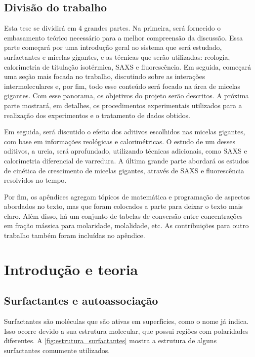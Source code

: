 
	\chapter*{Divisão do trabalho}
Esta tese se dividirá em 4 grandes partes. Na primeira, será fornecido o embasamento teórico necessário para a melhor compreensão da discussão. Essa parte começará por uma introdução geral ao sistema que será estudado, surfactantes e micelas gigantes, e as técnicas que serão utilizadas: reologia, calorimetria de titulação isotérmica, SAXS e fluorescência. Em seguida, começará uma seção mais focada no trabalho, discutindo sobre as interações intermoleculares e, por fim, todo esse conteúdo será focado na área de micelas gigantes. Com esse panorama, os objetivos do projeto serão descritos. A próxima parte mostrará, em detalhes, os procedimentos experimentais utilizados para a realização dos experimentos e o tratamento de dados obtidos.

Em seguida, será discutido o efeito dos aditivos escolhidos nas micelas gigantes, com base em informações reológicas e calorimétricas. O estudo de um desses aditivos, a ureia, será aprofundado, utilizando técnicas adicionais, como SAXS e calorimetria diferencial de varredura. A última grande parte abordará os estudos de cinética de crescimento de micelas gigantes, através de SAXS e fluorescência resolvidos no tempo.

Por fim, os apêndices agregam tópicos de matemática e programação de aspectos abordados no texto, mas que foram colocados a parte para deixar o texto mais claro. Além disso, há um conjunto de tabelas de conversão entre concentrações em fração mássica para molaridade, molalidade, etc. As contribuições para outro trabalho também foram incluídas no apêndice.

\part{Introdução e teoria}


	\chapter{Surfactantes e autoassociação}
	\label{sec:surfactantes_autoassociação}
	Surfactantes são moléculas que são ativas em superfícies, como o nome já indica.\cite{Lindman_livro} Isso ocorre devido a sua estrutura molecular, que possui regiões com polaridades diferentes. A \autoref{fig:estrutura_surfactantes} mostra a estrutura de alguns surfactantes comumente utilizados.
	
